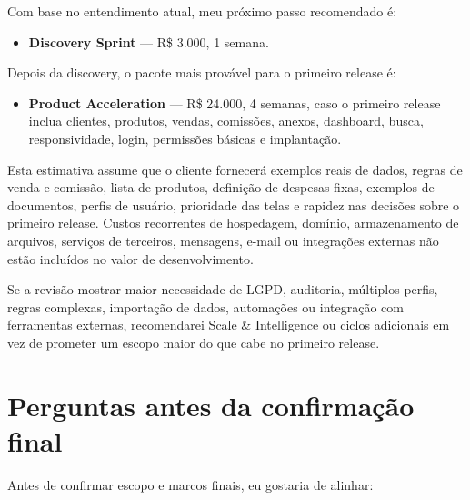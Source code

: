 \documentclass[11pt,a4paper]{article}
\begin{document}
Com base no entendimento atual, meu próximo passo recomendado é:\par

\begin{itemize}
\item \textbf{Discovery Sprint} --- R\$ 3.000, 1 semana.
\end{itemize}

Depois da discovery, o pacote mais provável para o primeiro release é:\par

\begin{itemize}
\item \textbf{Product Acceleration} --- R\$ 24.000, 4 semanas, caso o primeiro release inclua clientes, produtos, vendas, comissões, anexos, dashboard, busca, responsividade, login, permissões básicas e implantação.
\end{itemize}

Esta estimativa assume que o cliente fornecerá exemplos reais de dados, regras de venda e comissão, lista de produtos, definição de despesas fixas, exemplos de documentos, perfis de usuário, prioridade das telas e rapidez nas decisões sobre o primeiro release. Custos recorrentes de hospedagem, domínio, armazenamento de arquivos, serviços de terceiros, mensagens, e-mail ou integrações externas não estão incluídos no valor de desenvolvimento.\par

Se a revisão mostrar maior necessidade de LGPD, auditoria, múltiplos perfis, regras complexas, importação de dados, automações ou integração com ferramentas externas, recomendarei Scale \& Intelligence ou ciclos adicionais em vez de prometer um escopo maior do que cabe no primeiro release.\par

\section*{Perguntas antes da confirmação final}

Antes de confirmar escopo e marcos finais, eu gostaria de alinhar:\par
\end{document}
